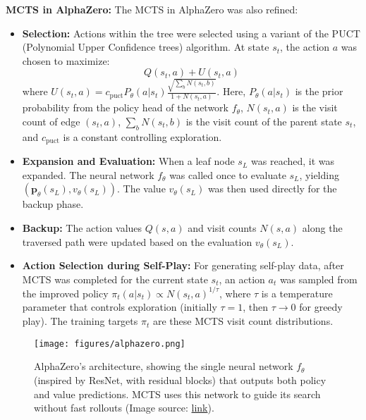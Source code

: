 \documentclass[11pt,a4paper]{article}
\begin{document}
\textbf{MCTS in AlphaZero:}
The MCTS in AlphaZero was also refined:
\begin{itemize}
    \item \textbf{Selection:} Actions within the tree were selected using a variant of the PUCT (Polynomial Upper Confidence trees) algorithm. At state $s_t$, the action $a$ was chosen to maximize:
    \[ Q(s_t, a) + U(s_t, a) \]
    where $U(s_t, a) = c_{\text{puct}} P_{\theta}(a|s_t) \frac{\sqrt{\sum_b N(s_t, b)}}{1 + N(s_t, a)}$. Here, $P_{\theta}(a|s_t)$ is the prior probability from the policy head of the network $f_{\theta}$, $N(s_t,a)$ is the visit count of edge $(s_t,a)$, $\sum_b N(s_t,b)$ is the visit count of the parent state $s_t$, and $c_{\text{puct}}$ is a constant controlling exploration.
    \item \textbf{Expansion and Evaluation:} When a leaf node $s_L$ was reached, it was expanded. The neural network $f_{\theta}$ was called once to evaluate $s_L$, yielding $(\mathbf{p}_{\theta}(s_L), v_{\theta}(s_L))$. The value $v_{\theta}(s_L)$ was then used directly for the backup phase.
    \item \textbf{Backup:} The action values $Q(s,a)$ and visit counts $N(s,a)$ along the traversed path were updated based on the evaluation $v_{\theta}(s_L)$.
    \item \textbf{Action Selection during Self-Play:} For generating self-play data, after MCTS was completed for the current state $s_t$, an action $a_t$ was sampled from the improved policy $\pi_t(a|s_t) \propto N(s_t,a)^{1/\tau}$, where $\tau$ is a temperature parameter that controls exploration (initially $\tau=1$, then $\tau \to 0$ for greedy play). The training targets $\pi_t$ are these MCTS visit count distributions.
\end{itemize}

\begin{figure}[t]
    \centering
    \texttt{[image: figures/alphazero.png]}
    \caption{AlphaZero's architecture, showing the single neural network $f_{\theta}$ (inspired by ResNet, with residual blocks) that outputs both policy and value predictions. MCTS uses this network to guide its search without fast rollouts (Image source: \href{https://www.researchgate.net/figure/AlphaZero-network-architecture_fig2_380820164}{link}).}
    \label{fig:alphazero_architecture}
\end{figure}
\end{document}
